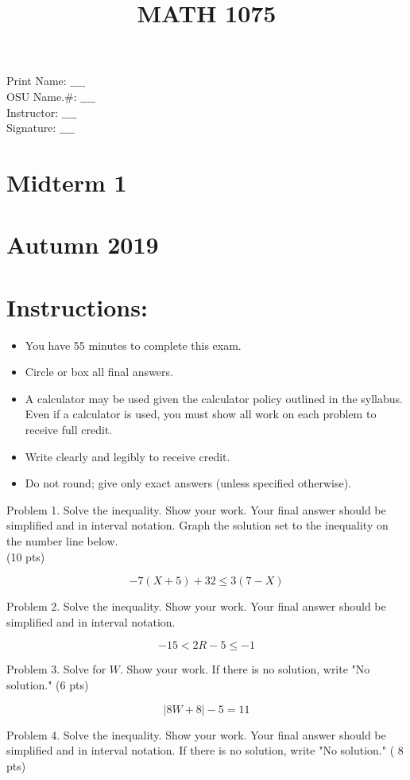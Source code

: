 \documentclass{ximera}
\title{MATH 1075 }
\author{}
\date{}
\begin{document}
Print Name: $\_\_\_\_$\\
OSU Name.\#: $\_\_\_\_$\\
Instructor: $\_\_\_\_$\\
Signature: $\_\_\_\_$

\section*{Midterm 1}
\section*{Autumn 2019}
\section*{Instructions:}
\begin{itemize}
  \item You have 55 minutes to complete this exam.
  \item Circle or box all final answers.
  \item A calculator may be used given the calculator policy outlined in the syllabus. Even if a calculator is used, you must show all work on each problem to receive full credit.
  \item Write clearly and legibly to receive credit.
  \item Do not round; give only exact answers (unless specified otherwise).
\end{itemize}

Problem 1. Solve the inequality. Show your work. Your final answer should be simplified and in interval notation. Graph the solution set to the inequality on the number line below.\\
(10 pts)

$$-7(X+5)+32 \leq 3(7-X)$$


Problem 2. Solve the inequality. Show your work. Your final answer should be simplified and in interval notation.

$$-15<2 R-5 \leq-1$$

Problem 3. Solve for $W$. Show your work. If there is no solution, write "No solution." (6 pts)

$$|8 W+8|-5=11$$

Problem 4. Solve the inequality. Show your work. Your final answer should be simplified and in interval notation. If there is no solution, write "No solution." ( 8 pts)
\end{document}
